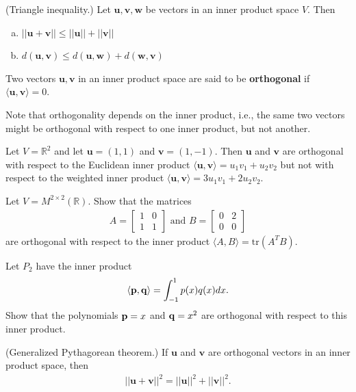 \documentclass[12pt,letterpaper,reqno]{article}
\numberwithin{equation}{section}
\newcommand{\bv}{\mathbf{v}}
\newcommand{\bw}{\mathbf{w}}
\newcommand{\bu}{\mathbf{u}}
\begin{document}
\begin{thm}
	(Triangle inequality.) Let $\bu,\bv,\bw$ be vectors in an inner product space $V$. Then
	\begin{enumerate}[(a)]
		\item $||\bu+\bv|| \leq ||\bu||+||\bv||$
		\item $d(\bu,\bv) \leq d(\bu,\bw)+d(\bw,\bv)$
	\end{enumerate}
\end{thm}

\begin{defn}
	Two vectors $\bu, \bv$ in an inner product space are said to be {\bf orthogonal} if $\langle \bu,\bv\rangle = 0$.
\end{defn}
Note that orthogonality depends on the inner product, i.e., the same two vectors might be orthogonal with respect to one inner product, but not another.

\begin{example}
	Let $V=\mathbb{R}^2$ and let $\bu=(1,1)$ and $\bv=(1,-1)$. Then $\bu$ and $\bv$ are orthogonal with respect to the Euclidean inner product $\langle \bu,\bv\rangle=u_1v_1+u_2v_2$ but not with respect to the weighted inner product $\langle \bu,\bv\rangle=3u_1v_1+2u_2v_2$.
\end{example}

\begin{exercise}
	Let $V=M^{2 \times 2}(\mathbb{R})$. Show that the matrices
	\begin{align*}
		A=\begin{bmatrix}
			1 & 0 \\
			1 & 1
		\end{bmatrix} \text{ and }B=\begin{bmatrix}
			0 & 2 \\ 0 & 0
		\end{bmatrix}
	\end{align*}
are orthogonal 
	 with respect to the inner product $\langle A,B\rangle=\text{tr}(A^TB)$.
\end{exercise}

\begin{exercise}
	Let $P_2$ have the inner product
	\begin{align*}
		\langle {\bf p}, {\bf q}\rangle=\int_{-1}^1 p(x)q(x)dx.
	\end{align*}
	Show that the polynomials ${\bf p}=x$ and ${\bf q}=x^2$ are orthogonal with respect to this inner product.
\end{exercise}

\begin{thm}
	(Generalized Pythagorean theorem.) If $\bu$ and $\bv$ are orthogonal vectors in an inner product space, then
	\begin{align*}
		||\bu+\bv||^2=||\bu||^2+||\bv||^2.
	\end{align*}
\end{thm}
\end{document}
